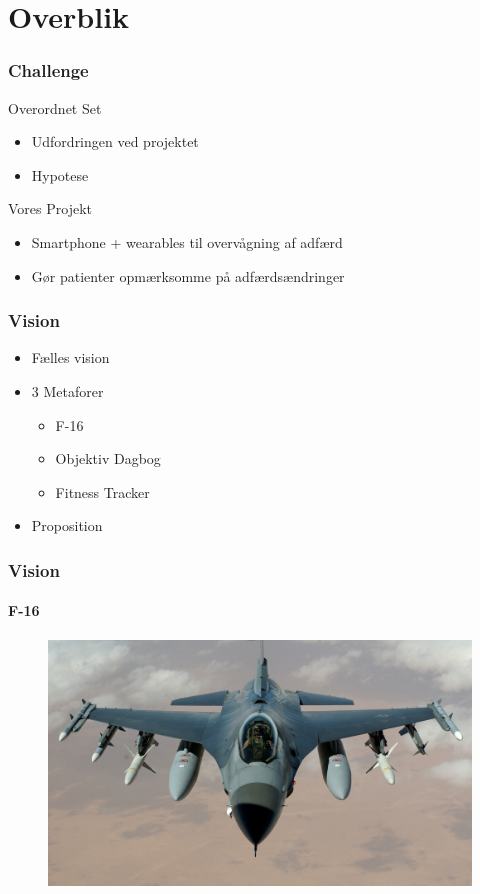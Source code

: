 \section{Overblik}
\begin{frame}
\frametitle{Challenge}
Overordnet Set
\begin{itemize}
	\item Udfordringen ved projektet
	\item Hypotese
\end{itemize}
Vores Projekt
\begin{itemize}
	\item Smartphone + wearables til overvågning af adfærd
	\item Gør patienter opmærksomme på adfærdsændringer
\end{itemize}
\end{frame}

\begin{frame}
\frametitle{Vision}
\begin{itemize}
	\item Fælles vision
	\item 3 Metaforer
	\begin{itemize}
		\item F-16
		\item Objektiv Dagbog
		\item Fitness Tracker
	\end{itemize}
	\item Proposition
\end{itemize}
\end{frame}

\begin{frame}
\frametitle{Vision}
\framesubtitle{F-16}
\begin{figure}
	\includegraphics[scale=0.4]{graphics/F16}
\end{figure}
\end{frame}

